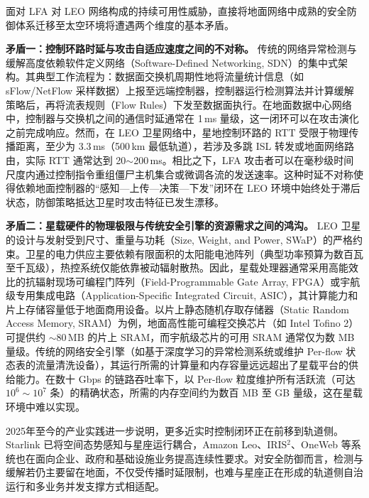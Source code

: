面对 LFA 对 LEO 网络构成的持续可用性威胁，直接将地面网络中成熟的安全防御体系迁移至太空环境将遭遇两个维度的基本矛盾。

\textbf{矛盾一：控制环路时延与攻击自适应速度之间的不对称。} 传统的网络异常检测与缓解高度依赖软件定义网络（Software-Defined Networking, SDN）的集中式架构。其典型工作流程为：数据面交换机周期性地将流量统计信息（如 sFlow/NetFlow 采样数据）上报至远端控制器，控制器运行检测算法并计算缓解策略后，再将流表规则（Flow Rules）下发至数据面执行。在地面数据中心网络中，控制器与交换机之间的通信时延通常在 1\,ms 量级，这一闭环可以在攻击演化之前完成响应。然而，在 LEO 卫星网络中，星地控制环路的 RTT 受限于物理传播距离，至少为 3.3\,ms（500\,km 最低轨道），若涉及多跳 ISL 转发或地面网络路由，实际 RTT 通常达到 20$\sim$200\,ms。相比之下，LFA 攻击者可以在毫秒级时间尺度内通过控制指令重组僵尸主机集合或微调各流的发送速率。这种时延不对称使得依赖地面控制器的“感知—上传—决策—下发”闭环在 LEO 环境中始终处于滞后状态，防御策略抵达卫星时攻击特征已发生漂移。

\textbf{矛盾二：星载硬件的物理极限与传统安全引擎的资源需求之间的鸿沟。} LEO 卫星的设计与发射受到尺寸、重量与功耗（Size, Weight, and Power, SWaP）的严格约束。卫星的电力供应主要依赖有限面积的太阳能电池阵列（典型功率预算为数百瓦至千瓦级），热控系统仅能依靠被动辐射散热。因此，星载处理器通常采用高能效比的抗辐射现场可编程门阵列（Field-Programmable Gate Array, FPGA）或宇航级专用集成电路（Application-Specific Integrated Circuit, ASIC），其计算能力和片上存储容量低于地面商用设备。以片上静态随机存取存储器（Static Random Access Memory, SRAM）为例，地面高性能可编程交换芯片（如 Intel Tofino 2）可提供约 $\sim$80\,MB 的片上 SRAM，而宇航级芯片的可用 SRAM 通常仅为数 MB 量级。传统的网络安全引擎（如基于深度学习的异常检测系统或维护 Per-flow 状态表的流量清洗设备），其运行所需的计算量和内存容量远远超出了星载平台的供给能力。在数十 Gbps 的链路吞吐率下，以 Per-flow 粒度维护所有活跃流（可达 $10^6 \sim 10^7$ 条）的精确状态，所需的内存空间约为数百 MB 至 GB 量级，这在星载环境中难以实现。

2025年至今的产业实践进一步说明，更多近实时控制闭环正在前移到轨道侧。Starlink 已将空间态势感知与星座运行耦合，Amazon Leo、IRIS$^2$、OneWeb 等系统也在面向企业、政府和基础设施业务提高连续性要求。对安全防御而言，检测与缓解若仍主要留在地面，不仅受传播时延限制，也难与星座正在形成的轨道侧自治运行和多业务并发支撑方式相适配。


